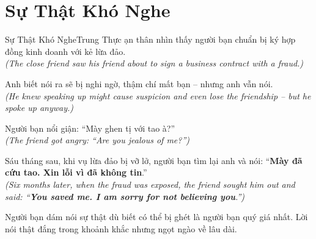 \section{Sự Thật Khó Nghe}
\begin{truyen}{Sự Thật Khó Nghe}{Trung Thực}
ạn thân nhìn thấy người bạn chuẩn bị ký hợp đồng kinh doanh với kẻ lừa đảo.\\
\textit{(The close friend saw his friend about to sign a business contract with a fraud.)}

Anh biết nói ra sẽ bị nghi ngờ, thậm chí mất bạn – nhưng anh vẫn nói.\\
\textit{(He knew speaking up might cause suspicion and even lose the friendship – but he spoke up anyway.)}

Người bạn nổi giận: ``Mày ghen tị với tao à?''\\
\textit{(The friend got angry: ``Are you jealous of me?'')}

Sáu tháng sau, khi vụ lừa đảo bị vỡ lở, người bạn tìm lại anh và nói: ``\textbf{Mày đã cứu tao. Xin lỗi vì đã không tin}.''\\
\textit{(Six months later, when the fraud was exposed, the friend sought him out and said: ``\textbf{You saved me. I am sorry for not believing you}.'')}
\end{truyen}
\begin{baihoc}
  Người bạn dám nói sự thật dù biết có thể bị ghét là người bạn quý giá nhất. Lời nói thật đắng trong khoảnh khắc nhưng ngọt ngào về lâu dài.
\end{baihoc}

